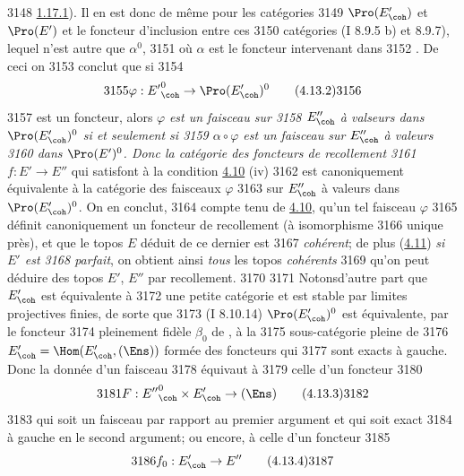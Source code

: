   3148	\hyperref[VI.cor1.17.1]{1.17.1}). Il en est donc de même pour les catégories
  3149	$\Pro(E'_{\coh})$ et $\Pro(E')$ et le foncteur d'inclusion entre ces
  3150	catégories (I 8.9.5 b) et 8.9.7), lequel n'est autre que $\alpha^{0}$,
  3151	où $\alpha$ est le foncteur intervenant dans
  3152	. De ceci on
  3153	conclut que si
  3154	\begin{equation*}
  3155	\varphi : {E'}^0_{\coh} \to \Pro (E'_{\coh})^0\tag{4.13.2}
  3156	\end{equation*}
  3157	est un foncteur, alors $\varphi$ \emph{est un faisceau sur
  3158	$E''_{\coh}$ à valseurs dans $\Pro(E'_{\coh})^0$ si et seulement si
  3159	$\alpha \circ \varphi$ est un faisceau sur $E''_{\coh}$ à valeurs
  3160	dans $\Pro(E')^{0}$. Donc la catégorie des foncteurs de recollement
  3161	$f : E'\to E''$} qui satisfont à la condition \hyperref[VI.prop4.10]{4.10} (iv)
  3162	est canoniquement équivalente à la catégorie des faisceaux $\varphi$
  3163	sur $E''_{\coh}$ à valeurs dans $\Pro(E'_{\coh})^0$. On en conclut,
  3164	compte tenu de \hyperref[VI.prop4.10]{4.10}, qu'un tel faisceau $\varphi$
  3165	définit canoniquement un foncteur de recollement (à isomorphisme
  3166	unique près), et  que le topos $E$ déduit de ce dernier est
  3167	\emph{cohérent}; de plus (\hyperref[VI.cor4.11]{4.11}) \emph{si $E'$ est
  3168	parfait}, on obtient ainsi \emph{tous} les topos \emph{cohérents}
  3169	qu'on peut déduire des topos $E'$, $E''$ par recollement.
  3170	
  3171	Notons\pageoriginale d'autre part que $E'_{\coh}$ est équivalente à
  3172	une petite catégorie et est stable par limites projectives finies, de sorte que
  3173	(I 8.10.14) $\Pro(E'_{\coh})^0$ est équivalente, par le foncteur
  3174	pleinement fidèle $\beta_0$ de , à la
  3175	sous-catégorie pleine de
  3176	$E'_{\coh} = \Hom(E'_{\coh}, (\Ens))$ formée des foncteurs qui
  3177	sont exacts à gauche. Donc la donnée d'un faisceau
  3178	 équivaut à
  3179	celle d'un foncteur
  3180	\begin{equation*}
  3181	F : {E''}_{\coh}^0 \times E'_{\coh} \to (\Ens)\tag{4.13.3}
  3182	\end{equation*}
  3183	qui soit un faisceau par rapport au premier argument et qui soit exact
  3184	à gauche en le second argument; ou encore, à celle d'un foncteur
  3185	\begin{equation*}
  3186	f_0 : E'_{\coh} \to E''\tag{4.13.4}
  3187	\end{equation*}
